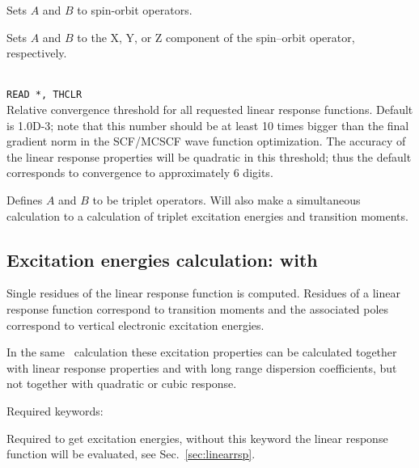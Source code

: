 \begin{description}
\item{}
Sets $A$ and $B$ to spin-orbit operators.

\item{}
Sets $A$ and $B$ to the X, Y, or Z component of the spin--orbit
operator, respectively.

\item{}\\
\verb|READ *, THCLR|\\
Relative convergence threshold for all requested linear response functions.
Default is 1.0D-3; note that this number should be at least 10 times
bigger than the final gradient norm in the SCF/MCSCF
wave function optimization. The accuracy of the linear response
properties will be quadratic in this threshold; thus the default
corresponds to convergence to approximately 6 digits.

\item{} Defines $A$ and $B$ to be triplet operators.
Will also make a simultaneous   calculation to
a calculation of triplet excitation energies and transition moments.


\end{description}

\subsection{Excitation energies calculation:  with }

Single residues of the linear
response function is
computed. Residues of a linear response function correspond to
transition moments and the associated poles
correspond to vertical electronic excitation energies.

In the same \resp\ calculation these excitation properties can be calculated
together with linear response properties
and with long range dispersion coefficients, but not
together with quadratic or cubic response.

Required keywords:

\begin{description}

\item{} Required to get excitation energies, without
this keyword the linear response function will be evaluated, see Sec.~\ref{sec:linearrsp}.

\end{description}

